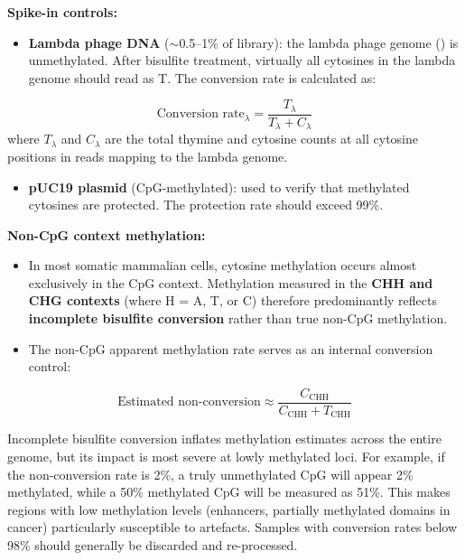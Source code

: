 \textbf{Spike-in controls:}
\begin{itemize}[itemsep=2pt]
  \item \textbf{Lambda phage DNA} ($\sim$0.5--1\% of library): the lambda phage genome () is unmethylated. After bisulfite treatment, virtually all cytosines in the lambda genome should read as T. The conversion rate is calculated as:
\end{itemize}
\begin{equation}
\label{eq:methylation:lambda-conversion}
\text{Conversion rate}_{\lambda} = \frac{T_{\lambda}}{T_{\lambda} + C_{\lambda}}
\end{equation}
where $T_{\lambda}$ and $C_{\lambda}$ are the total thymine and cytosine counts at all cytosine positions in reads mapping to the lambda genome.
\begin{itemize}[itemsep=2pt]
  \item \textbf{pUC19 plasmid} (CpG-methylated): used to verify that methylated cytosines are protected. The protection rate should exceed 99\%.
\end{itemize}

\textbf{Non-CpG context methylation:}
\begin{itemize}[itemsep=2pt]
  \item In most somatic mammalian cells, cytosine methylation occurs almost exclusively in the CpG context. Methylation measured in the \textbf{CHH and CHG contexts} (where H = A, T, or C) therefore predominantly reflects \textbf{incomplete bisulfite conversion} rather than true non-CpG methylation.
  \item The non-CpG apparent methylation rate serves as an internal conversion control:
\end{itemize}
\begin{equation}
\label{eq:methylation:chh-conversion}
\text{Estimated non-conversion} \approx \frac{C_{\text{CHH}}}{C_{\text{CHH}} + T_{\text{CHH}}}
\end{equation}

\begin{warningbox}
Incomplete bisulfite conversion inflates methylation estimates across the entire genome, but its impact is most severe at lowly methylated loci. For example, if the non-conversion rate is 2\%, a truly unmethylated CpG will appear 2\% methylated, while a 50\% methylated CpG will be measured as 51\%. This makes regions with low methylation levels (enhancers, partially methylated domains in cancer) particularly susceptible to artefacts. Samples with conversion rates below 98\% should generally be discarded and re-processed.
\end{warningbox}

